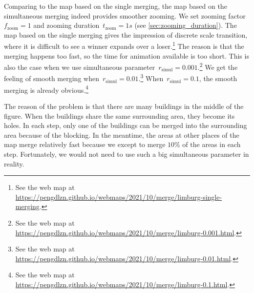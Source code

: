 \documentclass[twocolumn]{svjour3}          %
\begin{document}
Comparing to the map based on the single merging,
the map based on the simultaneous merging indeed 
provides smoother zooming.
We set zooming factor~$f_\mathrm{zoom}=1$ and 
zooming duration~$t_\mathrm{zoom}=1 s$ 
(see \sect\ref{sec:zooming_duration}).
The map based on the single merging gives the impression
of discrete scale transition, 
where it is difficult to see a winner expands over a loser.\footnote{%
See the web map at
\url{https://pengdlzn.github.io/webmaps/2021/10/merge/limburg-single-merging}.} 
The reason is that the merging happens too fast,
so the time for animation available is too short.
This is also the case when 
we use simultaneous parameter~$r_\mathrm{simul}= 0.001$.\footnote{%
See the web map at
\url{https://pengdlzn.github.io/webmaps/2021/10/merge/limburg-0.001.html}.}
We get the feeling of smooth merging when~$r_\mathrm{simul}= 0.01$.\footnote{%
See the web map at
\url{https://pengdlzn.github.io/webmaps/2021/10/merge/limburg-0.01.html}.}
When~$r_\mathrm{simul}= 0.1$, 
the smooth merging is already obvious.\footnote{%
See the web map at
\url{https://pengdlzn.github.io/webmaps/2021/10/merge/limburg-0.1.html}.}
 




The reason of the problem is that 
there are many buildings in the middle of the figure.
When the buildings share the same surrounding area,
they become its holes.
In each step, only one of the buildings can be merged into the surrounding area
because of the blocking.
In the meantime, the areas at other places of the map merge relatively fast
because we except to merge $10\%$ of the areas in each step.
Fortunately, we would not need to 
use such a big simultaneous parameter in reality.
\end{document}
